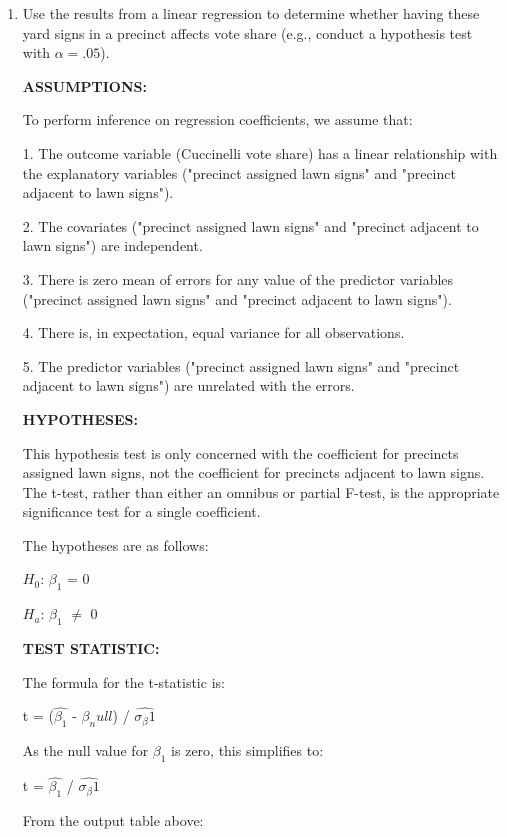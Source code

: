 \documentclass[12pt,letterpaper]{article}
\begin{document}
\vspace{.5cm}
\begin{enumerate}
	\item [(a)] Use the results from a linear regression to determine whether having these yard signs in a precinct affects vote share (e.g., conduct a hypothesis test with $\alpha = .05$). \vspace{6cm}
	
	\textbf{ASSUMPTIONS:}
	
	To perform inference on regression coefficients, we assume that:
	
	1. The outcome variable (Cuccinelli vote share) has a linear relationship with the explanatory variables ("precinct assigned lawn signs" and "precinct adjacent to lawn signs").
	
	2. The covariates ("precinct assigned lawn signs" and "precinct adjacent to lawn signs") are independent.
	
	3. There is zero mean of errors for any value of the predictor variables ("precinct assigned lawn signs" and "precinct adjacent to lawn signs").
	
	4. There is, in expectation, equal variance for all observations. 
	
	5. The predictor variables ("precinct assigned lawn signs" and "precinct adjacent to lawn signs") are unrelated with the errors.  \vspace{.5cm}
	
	\textbf{HYPOTHESES:}
	
	This hypothesis test is only concerned with the coefficient for precincts assigned lawn signs, not the coefficient for precincts adjacent to lawn signs. The t-test, rather than either an omnibus or partial F-test, is the appropriate significance test for a single coefficient. 
	
	The hypotheses are as follows:
	
	$H_0$: $\beta_1$ = 0
	
	$H_a$: $\beta_1$ $\neq$ 0
	
	 \vspace{.5cm}
	\textbf{TEST STATISTIC:} 
	
	The formula for the t-statistic is:
	
	t = ($\hat{\beta_1}$ - $\beta_null$) / $\hat{\sigma_\beta1}$
	
	As the null value for $\beta_1$ is zero, this simplifies to:
	
	t = $\hat{\beta_1}$ / $\hat{\sigma_\beta1}$
	
	From the output table above:
	

\end{enumerate}
\end{document}
